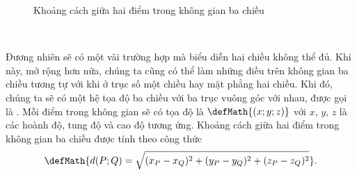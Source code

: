 \begin{figure}[H]
\begin{minipage}[b]{0.48\textwidth}
      \caption{Khoảng cách giữa hai điểm trong không gian ba chiều}
      \label{fig:khoang cach ba chieu}
   \end{minipage}
\end{figure}

\ %

Đương nhiên sẽ có một vài trường hợp mà biểu diễn hai chiều không thể đủ. Khi này, mở rộng hơn nữa, chúng ta cũng có thể làm những điều trên không gian ba chiều tương tự với khi ở trục số một chiều hay mặt phẳng hai chiều. Khi đó, chúng ta sẽ có một hệ tọa độ ba chiều với ba trục vuông góc với nhau, được gọi là . Mỗi điểm trong không gian sẽ có tọa độ là $\defMath{(x;y;z)}$ với $x$, $y$, $z$ là các hoành độ, tung độ và cao độ tương ứng. Khoảng cách giữa hai điểm trong không gian ba chiều được tính theo công thức $$\defMath{d(P;Q)=\sqrt{(x_P-x_Q)^2+(y_P-y_Q)^2+(z_P-z_Q)^2}}.$$

